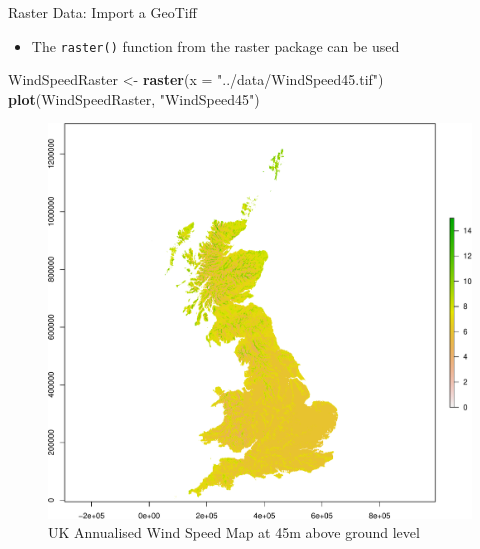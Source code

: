 \documentclass[10pt,ignorenonframetext,]{beamer}
\newenvironment{Shaded}{\begin{snugshade}}{\end{snugshade}}
\newcommand{\KeywordTok}[1]{\textcolor[rgb]{0.13,0.29,0.53}{\textbf{{#1}}}}
\newcommand{\DataTypeTok}[1]{\textcolor[rgb]{0.13,0.29,0.53}{{#1}}}
\newcommand{\StringTok}[1]{\textcolor[rgb]{0.31,0.60,0.02}{{#1}}}
\newcommand{\NormalTok}[1]{{#1}}
\providecommand{\tightlist}{%
  \setlength{\itemsep}{0pt}\setlength{\parskip}{0pt}}
\begin{document}
\begin{frame}[fragile]{Raster Data: Import a GeoTiff}

\begin{itemize}
\tightlist
\item
  The \texttt{raster()} function from the \alert{raster} package can be
  used
\end{itemize}

\begin{Shaded}
\begin{Highlighting}[]
\NormalTok{WindSpeedRaster <-}\StringTok{ }\KeywordTok{raster}\NormalTok{(}\DataTypeTok{x =} \StringTok{"../data/WindSpeed45.tif"}\NormalTok{)}
\KeywordTok{plot}\NormalTok{(WindSpeedRaster, }\StringTok{"WindSpeed45"}\NormalTok{)}
\end{Highlighting}
\end{Shaded}

\begin{figure}

{\centering \includegraphics[width=0.45\linewidth]{SpatialDataLecture_files/figure-beamer/get_rasterdir_pictures-1} 

}

\caption{UK Annualised Wind Speed Map at 45m above ground level}\label{fig:get_rasterdir_pictures}
\end{figure}

\end{frame}
\end{document}
